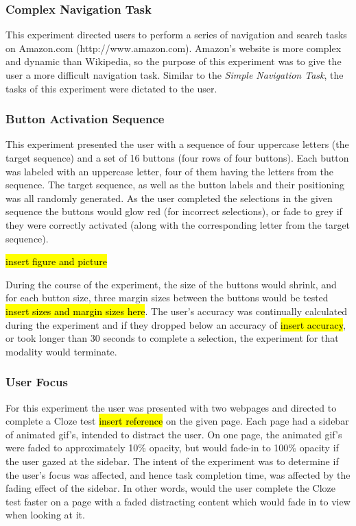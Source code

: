 \documentclass{sigchi}
\begin{document}
\subsubsection{Complex Navigation Task}
This experiment directed users to perform a series of navigation and
search tasks on Amazon.com (http://www.amazon.com). Amazon's website
is more complex and dynamic than Wikipedia, so the purpose of this 
experiment was to give the user a more difficult navigation task.
Similar to the \textit{Simple Navigation Task}, the tasks of this 
experiment were dictated to the user.

\subsubsection{Button Activation Sequence}
This experiment presented the user with a sequence of four uppercase 
letters (the target sequence) and a set of 16 buttons (four rows of 
four buttons). Each button was labeled with an uppercase letter, 
four of them having the letters from the sequence. The target sequence, 
as well as the button labels and their positioning was all randomly 
generated. As the user completed the selections in the given sequence
the buttons would glow red (for incorrect selections), or fade to grey
if they were correctly activated (along with the corresponding 
letter from the target sequence). 

\hl{insert figure and picture}

During the course of the experiment, the size of the buttons would 
shrink, and for each button size, three margin sizes between the buttons
would be tested \hl{insert sizes and margin sizes here}. The user's 
accuracy was continually calculated during the experiment and if they 
dropped below an accuracy of \hl{insert accuracy}, or took longer than
30 seconds to complete a selection, the experiment for that modality 
would terminate.

\subsubsection{User Focus}
For this experiment the user was presented with two webpages and 
directed to complete a Cloze test \hl{insert reference} on the given
page. Each page had a sidebar of animated gif's, intended to distract
the user. On one page, the animated gif's were faded to approximately
10\% opacity, but would fade-in to 100\% opacity if the user gazed at
the sidebar. The intent of the experiment was to determine if the user's
focus was affected, and hence task completion time, was affected by
the fading effect of the sidebar. In other words, would the user complete
the Cloze test faster on a page with a faded distracting content which
would fade in to view when looking at it.
\end{document}
